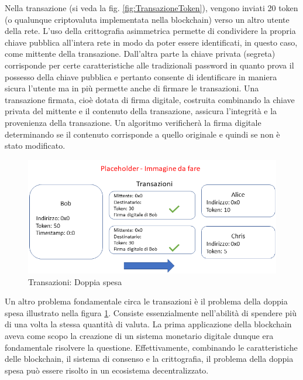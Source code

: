 Nella transazione (si veda la fig. \ref{fig:TransazioneToken}), vengono inviati 20 token (o qualunque criptovaluta implementata nella blockchain) verso un altro utente della rete. L’uso della crittografia asimmetrica permette di condividere la propria chiave pubblica all’intera rete in modo da poter essere identificati, in questo caso, come mittente della transazione. Dall’altra parte la chiave privata (segreta) corrisponde per certe caratteristiche alle tradizionali password in quanto prova il possesso della chiave pubblica e pertanto consente di identificare in maniera sicura l’utente ma in più permette anche di firmare le transazioni. Una transazione firmata, cioè dotata di firma digitale, costruita combinando la chiave privata del mittente e il contenuto della transazione, assicura l’integrità e la provenienza della transazione. Un algoritmo verificherà la firma digitale determinando se il contenuto corrisponde a quello originale e quindi se non è stato modificato.
\\

\begin{figure}[H]
\centering
\includegraphics[width=1\textwidth]{immagini/transazioneplaceholder2.png}
\caption{Transazioni: Doppia spesa}
\label{fig:TransazioneDoppiaSpesa}
\end{figure}

Un altro problema fondamentale circa le transazioni è il problema della doppia spesa illustrato nella figura \ref{fig:TransazioneDoppiaSpesa}. Consiste essenzialmente nell’abilità di spendere più di una volta la stessa quantità di valuta. La prima applicazione della blockchain aveva come scopo la creazione di un sistema monetario digitale dunque era fondamentale risolvere la questione. Effettivamente, combinando le caratteristiche delle blockchain, il sistema di consenso e la crittografia, il problema della doppia spesa può essere risolto in un ecosistema decentralizzato. 

